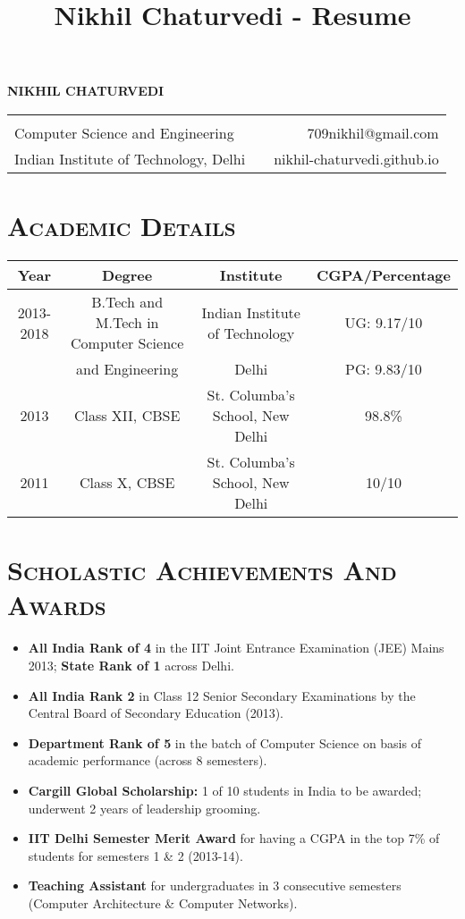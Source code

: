 \documentclass{article}
\title{Nikhil Chaturvedi - Resume}
\newcommand{\tmpsection}[1]{}
\let\tmpsection=\section
\renewcommand{\section}[1]{\tmpsection*{\textsc{#1}}}
\begin{document}
\begin{center}
 {\large \textsc{\textbf{NIKHIL CHATURVEDI}} }\\ 
\begin{tabular}{ l p{4cm} r }
    & &   \\
  Computer Science and Engineering & & 709nikhil@gmail.com \\
  Indian Institute of Technology, Delhi & & nikhil-chaturvedi.github.io \\
\end{tabular}
\end{center}


\section{Academic Details}
\begin{center}
\begin{tabular}{ |c | c | c | c |}
\hline
Year & Degree & Institute & CGPA/Percentage \\ 
\hline
2013-2018 & B.Tech and M.Tech in Computer Science & Indian Institute of Technology & UG: 9.17/10 \\ 
 & and Engineering & Delhi & PG: 9.83/10 \\ 
\hline
2013 & Class XII, CBSE & St. Columba's School, New Delhi & 98.8\% \\
\hline
2011 & Class X, CBSE & St. Columba's School,  New Delhi & 10/10 \\  \hline
\end{tabular}
\end{center}

\section{Scholastic Achievements And Awards}
\begin{itemize}
    \setlength\itemsep{0em}
    \item \textbf{All India Rank of 4} in the IIT Joint Entrance Examination (JEE) Mains 2013; \textbf{State Rank of 1} across Delhi.
  \item \textbf{All India Rank 2} in Class 12 Senior Secondary Examinations by the Central Board of Secondary Education (2013).
  \item \textbf{Department Rank of 5} in the batch of Computer Science on basis of academic performance (across 8 semesters).
    \item \textbf{Cargill Global Scholarship:} 1 of 10 students in India to be awarded; underwent 2 years of leadership grooming.
    \item \textbf{IIT Delhi Semester Merit Award} for having a CGPA in the top 7\% of students for semesters 1 \& 2 (2013-14).
\item \textbf{Teaching Assistant} for undergraduates in 3 consecutive semesters (Computer Architecture \& Computer Networks).
\end{itemize}
\end{document}
